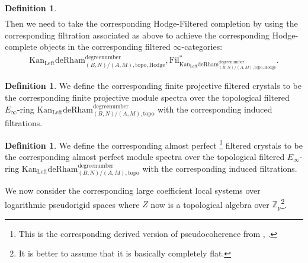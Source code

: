 \documentclass[11pt]{book}
\theoremstyle{definition}
\newtheorem{definition}[theorem]{Definition}
\numberwithin{equation}{section}
\begin{document}
\begin{definition}
\begin{align}
\end{align}
Then we need to take the corresponding Hodge-Filtered completion by using the corresponding filtration associated as above to achieve the corresponding Hodge-complete objects in the corresponding filtered $\infty$-categories:
\begin{align}
{\mathrm{Kan}_\mathrm{Left}\mathrm{deRham}}^\text{degreenumber}_{(B,N)/(A,M),\mathrm{topo,Hodge}},\mathrm{Fil}^*_{{\mathrm{Kan}_\mathrm{Left}\mathrm{deRham}}^\text{degreenumber}_{(B,N)/(A,M),\mathrm{topo,Hodge}}}.	
\end{align}
\end{definition}



\begin{definition}
We define the corresponding finite projective filtered crystals to be the corresponding finite projective module spectra over the topological filtered $E_\infty$-ring $\mathrm{Kan}_\mathrm{Left}\mathrm{deRham}^\text{degreenumber}_{(B,N)/(A,M),\mathrm{topo}}$ with the corresponding induced filtrations.	
\end{definition}


\begin{definition}
We define the corresponding almost perfect \footnote{This is the corresponding derived version of pseudocoherence from \cite{12Lu1}, \cite{12Lu2}.} filtered crystals to be the corresponding almost perfect module spectra over the topological filtered $E_\infty$-ring $\mathrm{Kan}_\mathrm{Left}\mathrm{deRham}^\text{degreenumber}_{(B,N)/(A,M),\mathrm{topo}}$ with the corresponding induced filtrations.	
\end{definition}


\indent We now consider the corresponding large coefficient local systems over logarithmic pseudorigid spaces where $Z$ now is a topological algebra over $\mathbb{Z}_p$\footnote{It is better to assume that it is basically completely flat.}.
\end{document}
